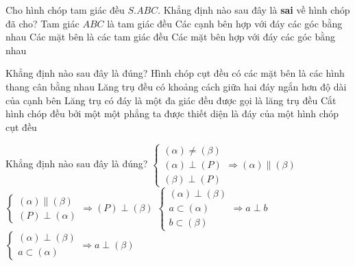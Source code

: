 \begin{ex}%
Cho hình chóp tam giác đều $S.ABC$. Khẳng định nào sau đây là \textbf{sai} về hình chóp đã cho? 
	\choice
	{Tam giác $ABC$ là tam giác đều}
	{Các cạnh bên hợp với đáy các góc bằng nhau}
	{\True Các mặt bên là các tam giác đều}
	{Các mặt bên hợp với đáy các góc bằng nhau}
\end{ex}

\begin{ex}%
Khẳng định nào sau đây là đúng?
	\choice
	{\True Hình chóp cụt đều có các mặt bên là các hình thang cân bằng nhau}
	{Lăng trụ đều có khoảng cách giữa hai đáy ngắn hơn độ dài của cạnh bên}
	{Lăng trụ có đáy là một đa giác đều được gọi là lăng trụ đều}
	{Cắt hình chóp đều bởi một một phẳng ta được thiết diện là đáy của một hình chóp cụt đều}
\end{ex}

\begin{ex}%
Khẳng định nào sau đây là đúng?
	\choice
	{$\begin{cases} \left( \alpha  \right) \ne \left( \beta  \right) \\ \left( \alpha  \right) \perp \left( P \right) \\ \left( \beta  \right) \perp \left( P \right)\end{cases} 
		\Rightarrow \left( \alpha  \right)\parallel \left( \beta  \right)$}
	{\True $\begin{cases}\left( \alpha  \right)\parallel \left( \beta  \right) \\ \left( P \right) \perp \left( \alpha  \right)\end{cases}
		 \Rightarrow \left( P \right) \perp \left( \beta  \right)$}
	{$\begin{cases} \left( \alpha  \right) \perp \left( \beta  \right) \\ a \subset \left( \alpha  \right) \\ b \subset \left( \beta  \right)\end{cases} \Rightarrow a \perp b$}
	{$\begin{cases}\left( \alpha  \right) \perp \left( \beta  \right) \\ a \subset \left( \alpha  \right) \end{cases} \Rightarrow a \perp \left( \beta  \right)$}
\end{ex}

